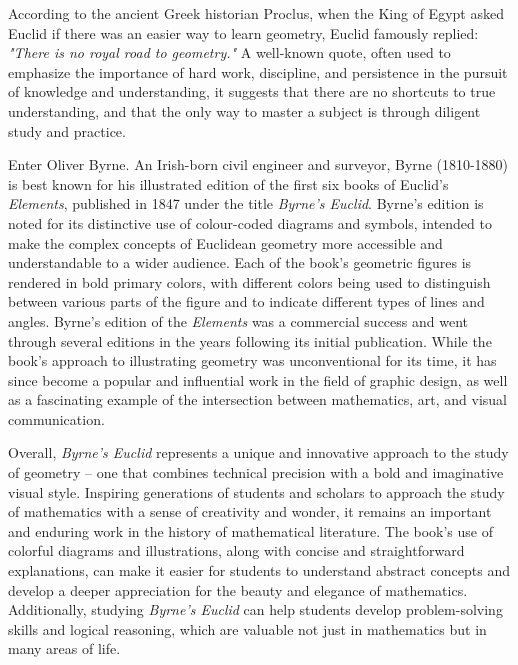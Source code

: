 \documentclass[twoside,11pt]{report}
\begin{document}
According to the ancient Greek historian Proclus, when the King of Egypt asked Euclid if there was an easier way to learn geometry, Euclid famously replied: \textit{"There is no royal road to geometry."} A well-known quote, often used to emphasize the importance of hard work, discipline, and persistence in the pursuit of knowledge and understanding, it suggests that there are no shortcuts to true understanding, and that the only way to master a subject is through diligent study and practice.

Enter Oliver Byrne.  An Irish-born civil engineer and surveyor, Byrne (1810-1880) is best known for his
illustrated edition of the first six books of Euclid’s \textit{Elements}, published in 1847 under the title
\textit{Byrne’s Euclid}. Byrne’s edition is noted for its distinctive use of colour-coded diagrams and symbols, intended to make the complex concepts of Euclidean geometry more accessible and understandable to a wider audience.  Each of the book’s geometric figures is rendered in bold primary colors, with different colors being used to distinguish between various parts of the figure and to indicate different types of lines and angles.  Byrne's edition of the \textit{Elements} was a commercial success and went through several editions in the years following its initial publication. While the book's approach to illustrating geometry was unconventional for its time, it has since become a popular and influential work in the field of graphic design, as well as a fascinating example of the intersection between mathematics, art, and visual communication.

Overall, \textit{Byrne's Euclid} represents a unique and innovative approach to the study of geometry -- one that combines technical precision with a bold and imaginative visual style. Inspiring generations of students and scholars to approach the study of mathematics with a sense of creativity and wonder, it
remains an important and enduring work in the history of mathematical literature.  The book's use of colorful diagrams and illustrations, along with concise and straightforward explanations, can make it easier for students to understand abstract concepts and develop a deeper appreciation for the beauty and elegance of mathematics. Additionally, studying \textit{Byrne's Euclid} can help students develop problem-solving skills and logical reasoning, which are valuable not just in mathematics but in many areas of life.
\end{document}
